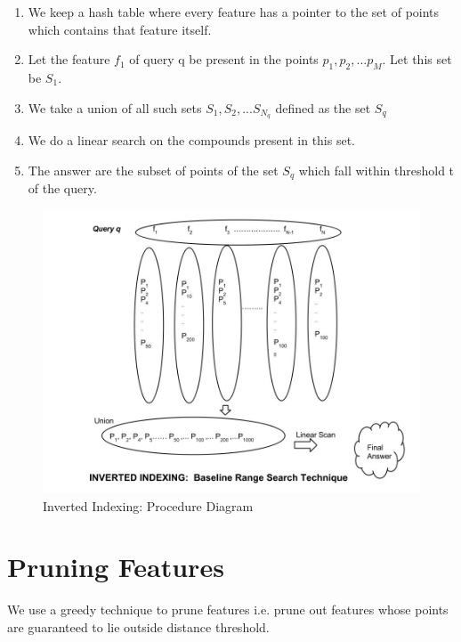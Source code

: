 \begin{enumerate}
	\item We keep a hash table where every feature has a pointer to the set of points which contains that feature itself.
	\item Let the feature $f_1$ of query q be present in the points $p_1,p_2,...p_M$. Let this set be $S_1$.
	\item We take a union of all such sets $S_1, S_2,...S_{N_q}$ defined as the set $S_q$
	\item We do a linear search on the compounds present in this set.
	\item The answer are the subset of points of the set $S_q$ which fall within threshold t of the query.	 
\end{enumerate}


\begin{figure}[ht]	
\centering
\includegraphics[width=1 \columnwidth]{img/image0c.jpg}
\caption{Inverted Indexing: Procedure Diagram}
\label{fig: invert}
\end{figure}




\section{Pruning Features}
\label{sec:prune1}
 We use a greedy technique to prune features i.e. prune out features whose points are guaranteed to lie outside distance threshold.
 
